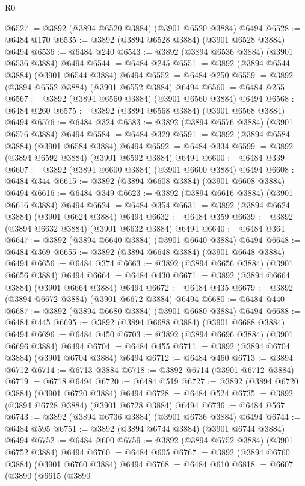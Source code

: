 \begin{lexlean}{R0}
\begin{coremodule}
@6527 := @3892 (@3894 @6520 @3884) (@3901 @6520 @3884) @6494
@6528 := @6484 @170
@6535 := @3892 (@3894 @6528 @3884) (@3901 @6528 @3884) @6494
@6536 := @6484 @240
@6543 := @3892 (@3894 @6536 @3884) (@3901 @6536 @3884) @6494
@6544 := @6484 @245
@6551 := @3892 (@3894 @6544 @3884) (@3901 @6544 @3884) @6494
@6552 := @6484 @250
@6559 := @3892 (@3894 @6552 @3884) (@3901 @6552 @3884) @6494
@6560 := @6484 @255
@6567 := @3892 (@3894 @6560 @3884) (@3901 @6560 @3884) @6494
@6568 := @6484 @260
@6575 := @3892 (@3894 @6568 @3884) (@3901 @6568 @3884) @6494
@6576 := @6484 @324
@6583 := @3892 (@3894 @6576 @3884) (@3901 @6576 @3884) @6494
@6584 := @6484 @329
@6591 := @3892 (@3894 @6584 @3884) (@3901 @6584 @3884) @6494
@6592 := @6484 @334
@6599 := @3892 (@3894 @6592 @3884) (@3901 @6592 @3884) @6494
@6600 := @6484 @339
@6607 := @3892 (@3894 @6600 @3884) (@3901 @6600 @3884) @6494
@6608 := @6484 @344
@6615 := @3892 (@3894 @6608 @3884) (@3901 @6608 @3884) @6494
@6616 := @6484 @349
@6623 := @3892 (@3894 @6616 @3884) (@3901 @6616 @3884) @6494
@6624 := @6484 @354
@6631 := @3892 (@3894 @6624 @3884) (@3901 @6624 @3884) @6494
@6632 := @6484 @359
@6639 := @3892 (@3894 @6632 @3884) (@3901 @6632 @3884) @6494
@6640 := @6484 @364
@6647 := @3892 (@3894 @6640 @3884) (@3901 @6640 @3884) @6494
@6648 := @6484 @369
@6655 := @3892 (@3894 @6648 @3884) (@3901 @6648 @3884) @6494
@6656 := @6484 @374
@6663 := @3892 (@3894 @6656 @3884) (@3901 @6656 @3884) @6494
@6664 := @6484 @430
@6671 := @3892 (@3894 @6664 @3884) (@3901 @6664 @3884) @6494
@6672 := @6484 @435
@6679 := @3892 (@3894 @6672 @3884) (@3901 @6672 @3884) @6494
@6680 := @6484 @440
@6687 := @3892 (@3894 @6680 @3884) (@3901 @6680 @3884) @6494
@6688 := @6484 @445
@6695 := @3892 (@3894 @6688 @3884) (@3901 @6688 @3884) @6494
@6696 := @6484 @450
@6703 := @3892 (@3894 @6696 @3884) (@3901 @6696 @3884) @6494
@6704 := @6484 @455
@6711 := @3892 (@3894 @6704 @3884) (@3901 @6704 @3884) @6494
@6712 := @6484 @460
@6713 := @3894 @6712
@6714 := @6713 @3884
@6718 := @3892 @6714 (@3901 @6712 @3884)
@6719 := @6718 @6494
@6720 := @6484 @519
@6727 := @3892 (@3894 @6720 @3884) (@3901 @6720 @3884) @6494
@6728 := @6484 @524
@6735 := @3892 (@3894 @6728 @3884) (@3901 @6728 @3884) @6494
@6736 := @6484 @567
@6743 := @3892 (@3894 @6736 @3884) (@3901 @6736 @3884) @6494
@6744 := @6484 @595
@6751 := @3892 (@3894 @6744 @3884) (@3901 @6744 @3884) @6494
@6752 := @6484 @600
@6759 := @3892 (@3894 @6752 @3884) (@3901 @6752 @3884) @6494
@6760 := @6484 @605
@6767 := @3892 (@3894 @6760 @3884) (@3901 @6760 @3884) @6494
@6768 := @6484 @610
@6818 := @6607
    (@3890
      (@6615
        (@3890

\end{coremodule}
\end{lexlean}
